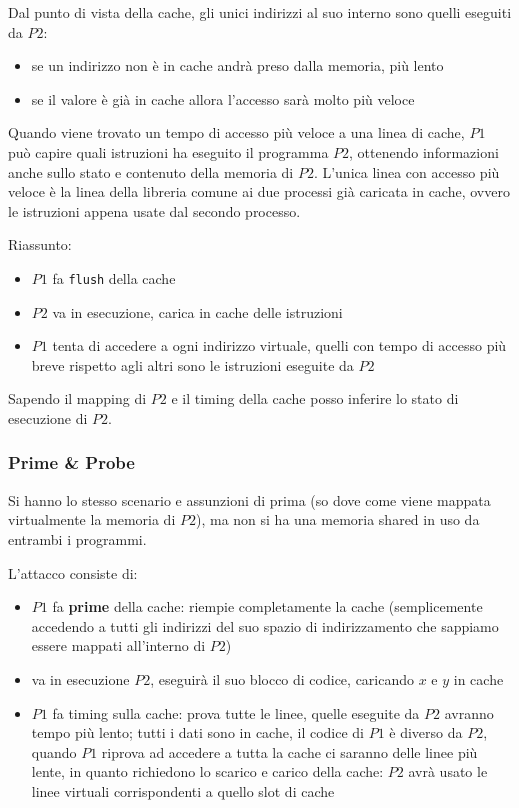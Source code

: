 Dal punto di vista della cache, gli unici indirizzi al suo interno sono quelli eseguiti da $P2$:
\begin{itemize}
	\item se un indirizzo non è in cache andrà preso dalla memoria, più lento
    
	\item se il valore è già in cache allora l'accesso sarà molto più veloce
\end{itemize}

Quando viene trovato un tempo di accesso più veloce a una linea di cache, $P1$ può capire quali istruzioni ha eseguito il programma $P2$, ottenendo informazioni anche sullo stato e contenuto della memoria di $P2$. L'unica linea con accesso più veloce è la linea della libreria comune ai due processi già caricata in cache, ovvero le istruzioni appena usate dal secondo processo.

Riassunto: 
\begin{itemize}
	\item $P1$ fa \texttt{flush} della cache
	
    \item $P2$ va in esecuzione, carica in cache delle istruzioni
	
    \item $P1$ tenta di accedere a ogni indirizzo virtuale, quelli con tempo di accesso più breve rispetto agli altri sono le istruzioni eseguite da $P2$
\end{itemize}

Sapendo il mapping di $P2$ e il timing della cache posso inferire lo stato di esecuzione di $P2$.

\subsubsection{Prime \& Probe}

Si hanno lo stesso scenario e assunzioni di prima (so dove come viene mappata virtualmente la memoria di $P2$), ma non si ha una memoria shared in uso da entrambi i programmi.

L'attacco consiste di:
\begin{itemize}
	\item $P1$ fa \textbf{prime} della cache: riempie completamente la cache (semplicemente accedendo a tutti gli indirizzi del suo spazio di indirizzamento che sappiamo essere mappati all'interno di $P2$)
    
	\item va in esecuzione $P2$, eseguirà il suo blocco di codice, caricando $x$ e $y$ in cache
	
    \item $P1$ fa timing sulla cache: prova tutte le linee, quelle eseguite da $P2$ avranno tempo più lento; tutti i dati sono in cache, il codice di $P1$ è diverso da $P2$, quando $P1$ riprova ad accedere a tutta la cache ci saranno delle linee più lente, in quanto richiedono lo scarico e carico della cache: $P2$ avrà usato le linee virtuali corrispondenti a quello slot di cache
\end{itemize}

